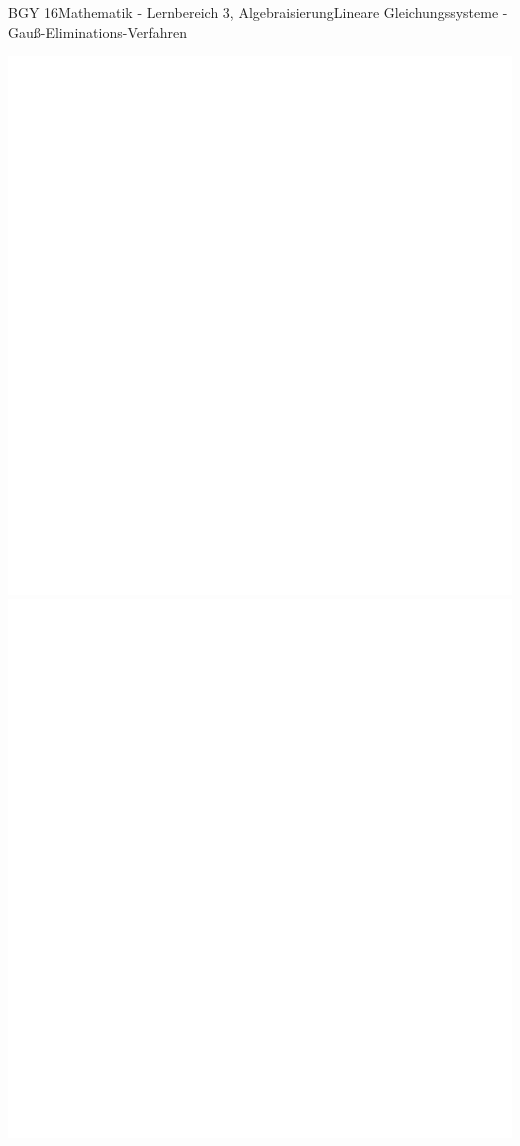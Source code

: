 \documentclass[oneside,openany,headings=optiontotoc,11pt,numbers=noenddot]{scrreprt}
\begin{document}
\begin{worksheet}{BGY 16}{Mathematik - Lernbereich 3, Algebraisierung}{Lineare Gleichungssysteme - Gauß-Eliminations-Verfahren}
		\begin{framed}
			\includegraphics[height=0.29\textheight]{../empty.jpg}\\
			\includegraphics[height=0.95\textheight]{../empty.jpg}
		\end{framed}
	\end{worksheet}
\end{document}
